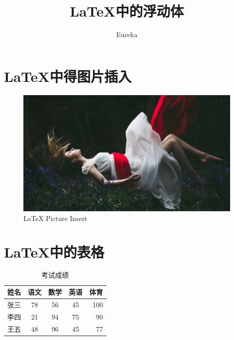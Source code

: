 \documentclass[fontset=windows, 12pt]{article}
\title{\LaTeX 中的浮动体}
\author{Eureka}
\date{}
\begin{document}
\maketitle

    \section{\LaTeX 中得图片插入}
     
    \begin{figure}[!htb]
        \centering %
        \includegraphics[scale=0.1]{falling.jpg}
        \caption{\LaTeX{} Picture Insert}
    \end{figure}



    \section{\LaTeX 中的表格}

    \begin{table}[!htb]
        \centering
        \begin{tabular}{||l| c| c| c |r|}%
            \hline \hline
            姓名&语文&数学&英语&体育\\%
            \hline
            张三&78&56&45&100\\
            \hline
            李四&21&94&75&90\\
            \hline
            王五&48&96&45&77\\
            \hline
        \end{tabular}
        \caption{考试成绩}
    \end{table}
\end{document}
